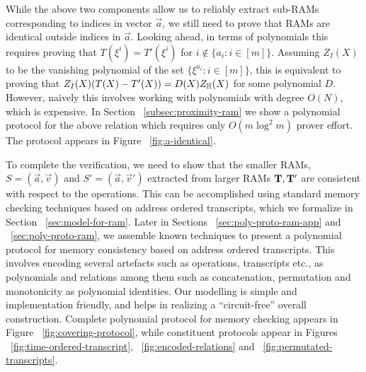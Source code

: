 \smallskip

 While the above two components allow us to reliably extract sub-RAMs
corresponding to indices in vector $\vec{a}$, we still need to prove that RAMs are identical outside indices in
$\vec{a}$. Looking ahead, in terms of polynomials this requires proving that $T(\xi^i)=T'(\xi^i)$ for $i\not\in
\{a_i:i\in [m]\}$. Assuming $Z_I(X)$ to be the vanishing polynomial of the set $\{\xi^{a_i}:i\in [m]\}$,
this is equivalent to proving that $Z_I(X)(T(X) - T'(X)) = D(X)Z_\mathbb{H}(X)$ for some polynomial $D$. However, naively
this involves working with polynomials with degree $O(N)$, which is expensive.
In Section ~\ref{subsec:proximity-ram} we show a polynomial protocol for the above relation which requires only $O(m\log^2 m)$ prover effort. The protocol
appears in Figure ~\ref{fig:a-identical}.

\smallskip

 To complete the verification, we need to show that
the smaller RAMs, $S=(\vec{a},\vec{v})$ and $S'=(\vec{a},\vec{v}')$ extracted from larger RAMs $\mathbf{T},\mathbf{T}'$
are consistent with respect to the operations. This can be accomplished using standard memory checking techniques
based on address ordered transcripts, which we formalize in Section ~\ref{sec:model-for-ram}. Later in
Sections ~\ref{sec:poly-proto-ram-app} and ~\ref{sec:poly-proto-ram}, we assemble known techniques to present
a polynomial protocol for memory consistency based on address ordered transcripts.
This involves encoding several artefacts such as operations, transcripts etc., as polynomials and relations
among them such as concatenation, permutation and monotonicity as polynomial identities. Our modelling is
simple and implementation friendly, and helps in realizing a ``circuit-free'' overall construction. Complete
polynomial protocol for memory checking appears in Figure ~\ref{fig:covering-protocol}, while constituent protocols
appear in Figures ~\ref{fig:time-ordered-transcript}, ~\ref{fig:encoded-relations} and ~\ref{fig:permutated-transcripts}.

\smallskip

